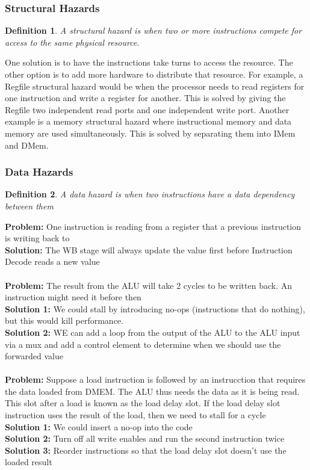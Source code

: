 \documentclass{article}
\newtheorem{definition}{Definition}
\begin{document}
\subsubsection{Structural Hazards}
\begin{definition}
    A structural hazard is when two or more instructions compete for access to the same physical resource.
\end{definition}
One solution is to have the instructions take turns to access the resource. The other option is to add more hardware to distribute that resource.
For example, a Regfile structural hazard would be when the processor needs to read registers for one instruction and write a register for another.
This is solved by giving the Regfile two independent read ports and one independent write port. Another example is a memory structural hazard where
instructional memory and data memory are used simultaneously. This is solved by separating them into IMem and DMem.
\subsubsection{Data Hazards}
\begin{definition}
    A data hazard is when two instructions have a data dependency between them
\end{definition}
\textbf{Problem: } One instruction is reading from a register that a previous instruction is writing back to\\
\textbf{Solution: } The WB stage will always update the value first before Instruction Decode reads a new value\\\\
\textbf{Problem: } The result from the ALU will take 2 cycles to be written back. An instruction might need it before then\\
\textbf{Solution 1: } We could stall by introducing no-ops (instructions that do nothing), but this would kill performance.\\
\textbf{Solution 2: } WE can add a loop from the output of the ALU to the ALU input via a mux and add a control element to 
determine when we should use the forwarded value\\\\
\textbf{Problem: } Suppose a load instruction is followed by an instrucction that requires the data loaded from DMEM. The ALU thus needs the data as it is being read. This slot after a load is known as the load delay slot.
If the load delay slot instruction uses the result of the load, then we need to stall for a cycle\\
\textbf{Solution 1: } We could insert a no-op into the code\\
\textbf{Solution 2: } Turn off all write enables and run the second instruction twice
\textbf{Solution 3: } Reorder instructions so that the load delay slot doesn't use the loaded result
\end{document}
